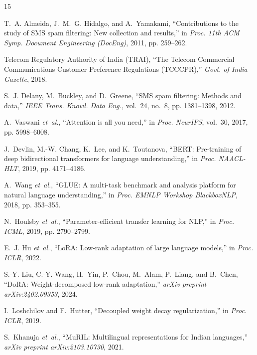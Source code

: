 \documentclass[conference]{IEEEtran}
\begin{document}
\begin{thebibliography}{15}

T.~A. Almeida, J.~M.~G. Hidalgo, and A.~Yamakami, ``Contributions to the study of SMS spam filtering: New collection and results,'' in \emph{Proc. 11th ACM Symp. Document Engineering (DocEng)}, 2011, pp. 259--262.

Telecom Regulatory Authority of India (TRAI), ``The Telecom Commercial Communications Customer Preference Regulations (TCCCPR),'' \emph{Govt. of India Gazette}, 2018.

S.~J. Delany, M.~Buckley, and D.~Greene, ``SMS spam filtering: Methods and data,'' \emph{IEEE Trans. Knowl. Data Eng.}, vol.~24, no.~8, pp. 1381--1398, 2012.

A.~Vaswani \emph{et~al.}, ``Attention is all you need,'' in \emph{Proc. NeurIPS}, vol.~30, 2017, pp. 5998--6008.

J.~Devlin, M.-W. Chang, K.~Lee, and K.~Toutanova, ``BERT: Pre-training of deep bidirectional transformers for language understanding,'' in \emph{Proc. NAACL-HLT}, 2019, pp. 4171--4186.

A.~Wang \emph{et~al.}, ``GLUE: A multi-task benchmark and analysis platform for natural language understanding,'' in \emph{Proc. EMNLP Workshop BlackboxNLP}, 2018, pp. 353--355.

N.~Houlsby \emph{et~al.}, ``Parameter-efficient transfer learning for NLP,'' in \emph{Proc. ICML}, 2019, pp. 2790--2799.

E.~J. Hu \emph{et~al.}, ``LoRA: Low-rank adaptation of large language models,'' in \emph{Proc. ICLR}, 2022.

S.-Y. Liu, C.-Y. Wang, H.~Yin, P.~Chou, M.~Alam, P.~Liang, and B.~Chen, ``DoRA: Weight-decomposed low-rank adaptation,'' \emph{arXiv preprint arXiv:2402.09353}, 2024.

I.~Loshchilov and F.~Hutter, ``Decoupled weight decay regularization,'' in \emph{Proc. ICLR}, 2019.

S.~Khanuja \emph{et~al.}, ``MuRIL: Multilingual representations for Indian languages,'' \emph{arXiv preprint arXiv:2103.10730}, 2021.


\end{thebibliography}
\end{document}

